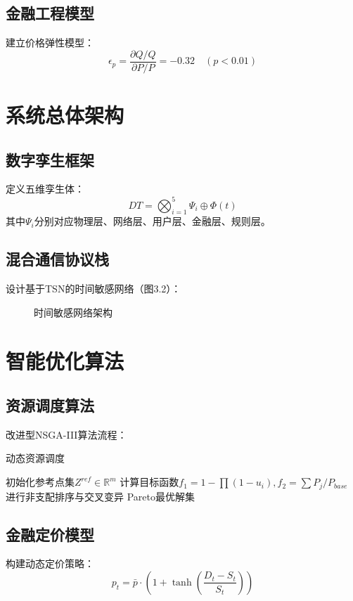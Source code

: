 \documentclass[12pt,a4paper]{IEEEtran} %
\begin{document}
\subsection{金融工程模型}
建立价格弹性模型：
\begin{equation}
	\epsilon_p = \frac{\partial Q/Q}{\partial P/P} = -0.32 \quad (p<0.01)
\end{equation}

\section{系统总体架构}
\subsection{数字孪生框架}
定义五维孪生体：
\begin{equation}
	DT = \bigotimes_{i=1}^5 \Psi_i \oplus \Phi(t)
\end{equation}
其中$\Psi_i$分别对应物理层、网络层、用户层、金融层、规则层。

\subsection{混合通信协议栈}
设计基于TSN的时间敏感网络（图3.2）：
\begin{figure}[htbp]
	\centering
	\caption{时间敏感网络架构}
\end{figure}

\section{智能优化算法}
\subsection{资源调度算法}
改进型NSGA-III算法流程：
\begin{algorithm}[htbp]
	\caption{动态资源调度}
	\begin{algorithmic}[1]
		\State 初始化参考点集$Z^{ref} \in \mathbb{R}^m$
		\State 计算目标函数$f_1=1-\prod(1-u_i), f_2=\sum P_j/P_{base}$
		\State 进行非支配排序与交叉变异
		\EndWhile
		\Return Pareto最优解集
	\end{algorithmic}
\end{algorithm}

\subsection{金融定价模型}
构建动态定价策略：
\begin{equation}
	p_t = \bar{p} \cdot \left(1 + \tanh\left(\frac{D_t - S_t}{S_t}\right)\right)
\end{equation}
\end{document}
